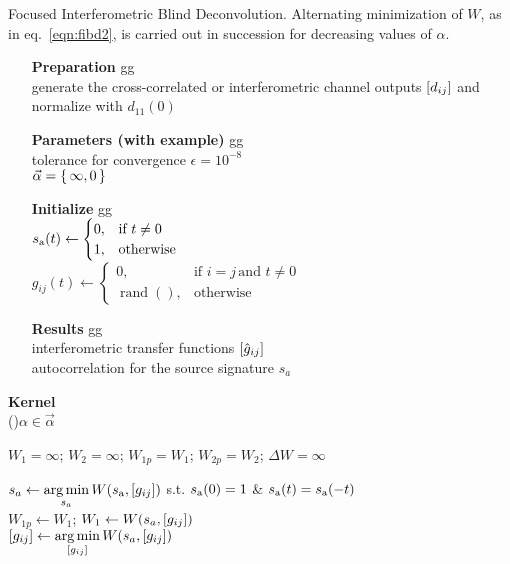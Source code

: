 
\LinesNumbered
\begin{algorithm2e} 
	\caption{Focused Interferometric Blind Deconvolution. Alternating minimization of $W$, as in
	{eq.}~\ref{eqn:fibd2}, is carried out {in succession for decreasing} values of $\alpha$.}
	\label{alg:fibd}
	\begin{itemize}
		\item[{\bf Preparation}]
		{\color{white} gg}\\
			generate the cross-correlated or interferometric channel outputs
			$[d_{ij}]$ and normalize with $d_{11}(0)$
		\item[{\bf Parameters (with example)}]
		{\color{white} gg}\\
		tolerance for convergence $\epsilon=10^{-8}$\\
			$\vec{\alpha}=\set{\infty,0}$
	\item[{\bf Initialize}] 
		{\color{white} gg}\\
			${{s}}_{\rm a}(t)\leftarrow\begin{cases}
				0, &\text{if } t\ne0\\
				1, &\text{otherwise}
			\end{cases}
				$\\
			$g_{ij}(t)\leftarrow
			\begin{cases}
				0, &\text{if } i=j\,\text{and }t\ne0 \\
				\operatorname{rand}(), & \text{otherwise}
			\end{cases}
			$\\
		\item[{\bf Results}]
		{\color{white} gg}\\
			interferometric transfer functions $[\hat{g}_{ij}]$ \\
			autocorrelation for the source signature $\hat{s}_a$
	\end{itemize}
	{\bf Kernel}\\
	\ForEach(){$\alpha\in{\vec{\alpha}}$}{
		$W_1=\infty$; $W_2=\infty$; $W_{1p}=W_1$; $W_{2p}=W_2$; $\Delta W=\infty$\\
	{

		{${s}_a \leftarrow  \operatorname*{arg\,min}\limits_{s_{a}} W({{s}}_{\rm a}, [{g}_{ij}])$ s.t. ${{s}}_{\rm a}(0)=1$ \& ${{s}}_{\rm a}(t)={{s}}_{\rm a}(-t)$ }
		\\
	$W_{1p} \leftarrow W_1$;
	     {$W_1\leftarrow W({s}_a, [{g}_{ij}])$} \\
	{$[{g}_{ij}] \leftarrow  \operatorname*{arg\,min}\limits_{[g_{ij}]} W({s}_a, [g_{ij}])$}
	
}}
\end{algorithm2e}
